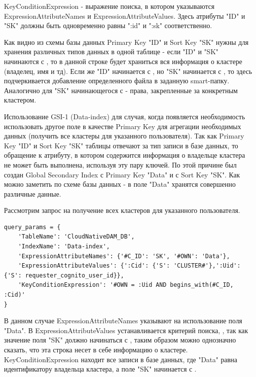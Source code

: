 KeyConditionExpression - выражение поиска, в котором указываются ExpressionAttributeNames и ExpressionAttributeValues. Здесь атрибуты "ID" и "SK" должны быть одновременно равны ":id" и ":sk" соответственно.

Как видно из схемы базы данных Primary Key "ID" и Sort Key "SK" нужны для хранения различных типов данных в одной таблице - если "ID" и "SK" начинаются с  , то в данной строке будет храниться вся информация о кластере (владелец, имя и тд). Если же "ID" начинается с , но "SK" начинается с , то здесь подчеркивается добавление определенного файла в заданную smart-папку. Аналогично для "SK" начинающегося с  - права, закрепленные за конкретным кластером.

Использование GSI-1 (Data-index) для случая, когда появляется необходимость использовать другое поле в качестве Primary Key для агрегации необходимых данных (получить все кластеры для указанного пользователя). Так как Primary Key "ID" и Sort Key "SK" таблицы отвечают за тип записи в базе данных, то обращение к атрибуту, в котором содержится информация о владельце кластера не может быть выполнена, используя эту пару ключей. По этой причине был создан Global Secondary Index с Primary Key "Data" и с Sort Key "SK". Как можно заметить по схеме базы данных - в поле "Data" хранятся совершенно различные данные.

\clearpage

Рассмотрим запрос на получение всех кластеров для указанного пользователя.
\begin{lstlisting}
query_params = {
    'TableName': 'CloudNativeDAM_DB',
    'IndexName': 'Data-index',
    'ExpressionAttributeNames': {'#C_ID': 'SK', '#OWN': 'Data'},
    'ExpressionAttributeValues': {':Cid': {'S': 'CLUSTER#'},':Uid': {'S': requester_cognito_user_id}},
    'KeyConditionExpression': '#OWN = :Uid AND begins_with(#C_ID, :Cid)'
}
\end{lstlisting}

В данном случае ExpressionAttributeNames указывают на использование поля "Data". В ExpressionAttributeValues устанавливается критерий поиска, , так как значение поля "SK" должно начинаться с , таким образом можно однозначно сказать, что эта строка несет в себе информацию о кластере. KeyConditionExpression находит все записи в базе данных, где "Data" равна идентификатору владельца кластера, а поле "SK" начинается с .

